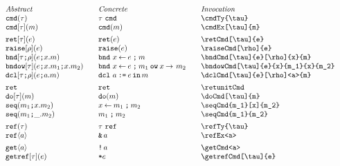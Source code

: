 \documentclass[11pt]{article}
\begin{document}
\begin{figure}

  \begin{small}
    \begin{displaymath}
      \begin{array}{l@{\qquad}l@{\qquad}l@{\qquad}l}
        \textit{Abstract} & \textit{Concrete} & \textit{Invocation} \\
        \cmdTy{\tau}               & \cmdTy*{\tau}               & \verb|\cmdTy{\tau}|               \\
        \cmdEx[\tau]{m}            & \cmdEx*{m}                  & \verb|\cmdEx[\tau]{m}|            \\[1ex]
        \retCmd[\tau]{e}           & \retCmd*{e}                 & \verb|\retCmd[\tau]{e}|           \\
        \raiseCmd[\rho]{e}         & \raiseCmd*{e}               & \verb|\raiseCmd[\rho]{e}| \\
        \bndCmd[\tau]{e}[\rho]{x}{m}           & \bndCmd*{e}{x}{m}           & \verb|\bndCmd[\tau]{e}[\rho]{x}{m}|           \\
        \bndowCmd[\tau]{e}{x}{m_1}{x}{m_2}     & \bndowCmd*{e}{x}{m_1}{x}{m_2}  & \verb|\bndowCmd[\tau]{e}{x}{m_1}{x}{m_2}| \\
        \dclCmd[\tau]{e}[\rho]<a>{m}           & \dclCmd*{e}<a>{m}           & \verb|\dclCmd[\tau]{e}[\rho]<a>{m}|           \\[1ex]
        \retunitCmd{}              & \retunitCmd*{}              & \verb|\retunitCmd| \\
        \doCmd[\tau]{m}            & \doCmd*{m}                  & \verb|\doCmd[\tau]{m}| \\
        \seqCmd{m_1}[x]{m_2}       & \seqCmd*{m_1}[x]{m_2}       & \verb|\seqCmd{m_1}[x]{m_2}| \\
        \seqCmd{m_1}{m_2}          & \seqCmd*{m_1}{m_2}          & \verb|\seqCmd{m_1}{m_2}| \\[1ex]
        \refTy{\tau}               & \refTy*{\tau}               & \verb|\refTy{\tau}| \\
        \refEx<a>                  & \refEx*<a>                  & \verb|\refEx<a>|                  \\[1ex]
        \getCmd<a>                 & \getCmd*<a>                 & \verb|\getCmd<a>|                 \\
        \getrefCmd[\tau]{e}        & \getrefCmd*{e}              & \verb|\getrefCmd[\tau]{e}|        \\

\end{array}
\end{displaymath}
\end{small}
\end{figure}
\end{document}
